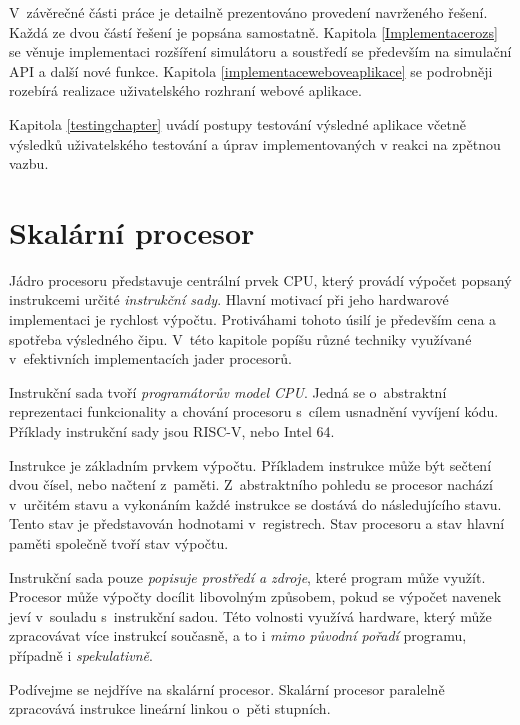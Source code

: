 V~závěrečné části práce je detailně prezentováno provedení navrženého řešení.
Každá ze dvou částí řešení je popsána samostatně.
Kapitola \ref{Implementacerozs} se věnuje implementaci rozšíření simulátoru a soustředí se především na simulační API a další nové funkce.
Kapitola \ref{implementaceweboveaplikace} se podrobněji rozebírá realizace uživatelského rozhraní webové aplikace.

Kapitola \ref{testingchapter} uvádí postupy testování výsledné aplikace včetně výsledků uživatelského testování a úprav implementovaných v reakci na zpětnou vazbu.  

%
%

\chapter{Skalární procesor}
\label{scalarchapter}
% 

Jádro procesoru představuje centrální prvek CPU, který provádí výpočet popsaný instrukcemi určité \emph{instrukční sady}.
Hlavní motivací při jeho hardwarové implementaci je rychlost výpočtu.
Protiváhami tohoto úsilí je především cena a spotřeba výsledného čipu.
V~této kapitole popíšu různé techniky využívané v~efektivních implementacích jader procesorů.

Instrukční sada tvoří \emph{programátorův model CPU}.
Jedná se o~abstraktní reprezentaci funkcionality a chování procesoru s~cílem usnadnění vyvíjení kódu.
Příklady instrukční sady jsou RISC-V, nebo Intel 64.

Instrukce je základním prvkem výpočtu.
Příkladem instrukce může být sečtení dvou čísel, nebo načtení z~paměti.
Z~abstraktního pohledu se procesor nachází v~určitém stavu a vykonáním každé instrukce se dostává do následujícího stavu.
Tento stav je představován hodnotami v~registrech.
Stav procesoru a stav hlavní paměti společně tvoří stav výpočtu.

Instrukční sada pouze \emph{popisuje prostředí a zdroje}, které program může využít.
Procesor může výpočty docílit libovolným způsobem, pokud se výpočet navenek jeví v~souladu s~instrukční sadou.
Této volnosti využívá hardware, který může zpracovávat více instrukcí současně, a to i \emph{mimo původní pořadí} programu, případně i \emph{spekulativně}. \cite{QuantApproach}

Podívejme se nejdříve na skalární procesor.
Skalární procesor paralelně zpracovává instrukce lineární linkou o~pěti stupních.

